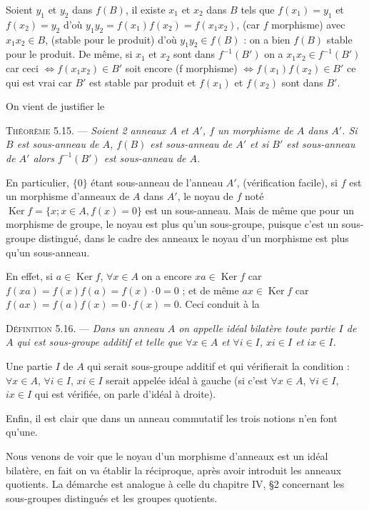 Soient $y_1$ et $y_2$ dans $f(B)$, il existe $x_1$ et $x_2$ dans $B$ tels que $f(x_1)=y_1$ et $f(x_2)=y_2$ d'où $y_1y_2=f(x_1)f(x_2)=f(x_1x_2)$, (car $f$ morphisme) avec $x_1x_2\in B$, (stable pour le produit) d'où $y_1y_2\in f(B)$ : on a bien $f(B)$ stable pour le produit. De même, si $x_1$ et $x_2$ sont dans $f^{-1}(B')$ on a $x_1x_2\in f^{-1}(B')$ car ceci $\Longleftrightarrow f(x_1x_2)\in B'$ soit encore (f morphisme) $\Longleftrightarrow f(x_1)f(x_2)\in B'$ ce qui est vrai car $B'$ est stable par produit et $f(x_1)$ et $f(x_2)$ sont dans $B'$. \bookend

On vient de justifier le

\medskip\noindent\textsc{Théorème 5.15.} --- \emph{Soient 2 anneaux $A$ et $A'$, $f$ un morphisme de $A$ dans $A'$. Si $B$ est sous-anneau de $A$, $f(B)$ est sous-anneau de $A'$ et si $B'$ est sous-anneau de $A'$ alors $f^{-1}(B')$ est sous-anneau de $A$.} \bookend

En particulier, $\{0\}$ étant sous-anneau de l'anneau $A'$, (vérification facile), si $f$ est un morphisme d'anneaux de $A$ dans $A'$, le noyau de $f$ noté $\operatorname{Ker}f=\{x;x\in A,f(x)=0\}$ est un sous-anneau. Mais de même que pour un morphisme de groupe, le noyau est plus qu'un sous-groupe, puisque c'est un sous-groupe distingué, dans le cadre des anneaux le noyau d'un morphisme est plus qu'un sous-anneau.

En effet, si $a\in\operatorname{Ker}f$, $\forall x\in A$ on a encore $xa\in\operatorname{Ker}f$ car $f(xa)=f(x)f(a)=f(x)\cdot0=0$ ; et de même $ax\in\operatorname{Ker}f$ car $f(ax)=f(a)f(x)=0\cdot f(x)=0$. Ceci conduit à la

\medskip\noindent\textsc{Définition 5.16.} --- \emph{Dans un anneau $A$ on appelle idéal bilatère toute partie $I$ de $A$ qui est sous-groupe additif et telle que $\forall x\in A$ et $\forall i\in I$, $xi\in I$ et $ix\in I$.}

Une partie $I$ de $A$ qui serait sous-groupe additif et qui vérifierait la condition : $\forall x\in A$, $\forall i\in I$, $xi\in I$ serait appelée idéal à gauche (si c'est $\forall x\in A$, $\forall i\in I$, $ix\in I$ qui est vérifiée, on parle d'idéal à droite).

Enfin, il est clair que dans un anneau commutatif les trois notions n'en font qu'une.

Nous venons de voir que le noyau d'un morphisme d'anneaux est un idéal bilatère, en fait on va établir la réciproque, après avoir introduit les anneaux quotients. La démarche est analogue à celle du chapitre IV, §2 concernant les sous-groupes distingués et les groupes quotients.

